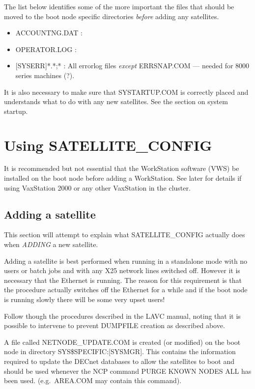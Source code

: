 The list below identifies some of the more important the files that should be
moved  to the boot node specific directories {\em before} adding any satellites.
\begin {itemize}
\item {ACCOUNTNG.DAT :}
\item {OPERATOR.LOG :}
\item {[SYSERR]*.*;* :} All errorlog files {\em except } ERRSNAP.COM --- needed
 for 8000 series machines (?).
\end {itemize}

It is also necessary to make sure that SYSTARTUP.COM is correctly placed
and understands what to do with any new satellites.
See the section on system startup.

\section {Using SATELLITE\_CONFIG}

It is recommended but not essential that the WorkStation software (VWS) be
installed on the boot node before adding a WorkStation.
See later for details if using VaxStation 2000 or any other VaxStation in the
cluster.

\subsection {Adding a satellite}

This section will attempt to explain what SATELLITE\_CONFIG actually does when
{\em ADDING } a new satellite.

Adding a satellite is best performed when running in a standalone mode with
no users or batch jobs and with any X25 network lines switched off.
However it is necessary that the Ethernet is running.
The reason for this requirement is that the procedure actually switches off the
Ethernet for a while and if the boot node is running slowly there will be
some very upset users!

Follow though the procedures described in the LAVC manual, noting that it is
possible to intervene to prevent DUMPFILE creation as described above.

A file called NETNODE\_UPDATE.COM is created (or modified) on the boot node
in directory SYS\$SPECIFIC:[SYSMGR].
This contains the information required to update the DECnet databases to allow
the satellites to boot and should be used whenever the NCP command
PURGE KNOWN NODES ALL has been used.
(e.g.\ AREA.COM may contain this command).

